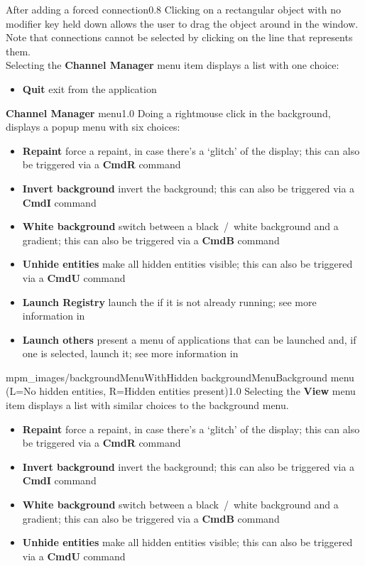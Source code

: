 %
{After adding a forced connection}{0.8}
\condPage{}
Clicking on a rectangular object with no modifier key held down allows the user to drag
the object around in the window.
Note that connections cannot be selected by clicking on the line that represents them.\\

Selecting the \textbf{Channel Manager} menu item displays a list with one choice:
\begin{itemize}
\item\textbf{Quit} exit from the application
\end{itemize}
%
{\textbf{Channel Manager} menu}{1.0}
\condPage{}
Doing a right\longDash{}mouse click in the background, displays a popup menu with six
choices:
\begin{itemize}
\item\textbf{Repaint} force a repaint, in case there's a `glitch' of the display; this
can also be triggered via a \textbf{Cmd\longDash{}R} command
\item\exSp\textbf{Invert background} invert the background; this can also be triggered via
a \textbf{Cmd\longDash{}I} command
\item\exSp\textbf{White background} switch between a black~/~white background and a
gradient; this can also be triggered via a \textbf{Cmd\longDash{}B} command
\item\exSp\textbf{Unhide entities} make all hidden entities visible; this can also be
triggered via a \textbf{Cmd\longDash{}U} command
\item\exSp\textbf{Launch Registry} launch the \emph{\RS} if it is not already running; see
more information in\\
\item\exSp\textbf{Launch others \textellipsis} present a menu of applications that can be
launched and, if one is selected, launch it; see more information in
\end{itemize}
%
{mpm_images/backgroundMenuWithHidden}%
{backgroundMenu}{Background menu (L=No hidden entities, R=Hidden entities present)}{1.0}
\condPage{}
Selecting the \textbf{View} menu item displays a list with similar choices to the
background menu.
\begin{itemize}
\item\textbf{Repaint} force a repaint, in case there's a `glitch' of the display; this
can also be triggered via a \textbf{Cmd\longDash{}R} command
\item\exSp\textbf{Invert background} invert the background; this can also be triggered via
a \textbf{Cmd\longDash{}I} command
\item\exSp\textbf{White background} switch between a black~/~white background and a
gradient; this can also be triggered via a \textbf{Cmd\longDash{}B} command
\item\exSp\textbf{Unhide entities} make all hidden entities visible; this can also be
triggered via a \textbf{Cmd\longDash{}U} command
\end{itemize}
